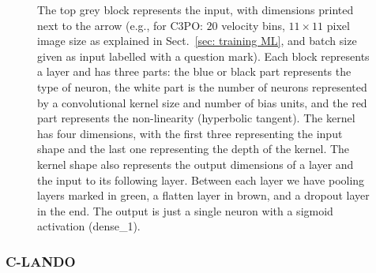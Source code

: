 \documentclass{aa}
\begin{document}
\begin{figure}[!t]
{    The top grey block represents the input, with dimensions printed next to the arrow (e.g., for C3PO: $20$ velocity bins, $11\times11$ pixel image size as explained in Sect.~\ref{sec: training ML}, and batch size given as input labelled with a question mark).
    Each block represents a layer and has three parts: the blue or black part represents the type of neuron, the white part is the number of neurons represented by a convolutional kernel size and number of bias units, and the red part represents the non-linearity (hyperbolic tangent).
    The kernel has four dimensions, with the first three representing the input shape and the last one representing the depth of the kernel.
    The kernel shape also represents the output dimensions of a layer and the input to its following layer. %
    Between each layer we have pooling layers marked in green, a flatten layer in brown, and a dropout layer in the end. 
    The output is just a single neuron with a sigmoid activation (dense\_1).}
    \label{fig:c3po schematic}
\end{figure}

\subsubsection{C-LANDO}
\end{document}

